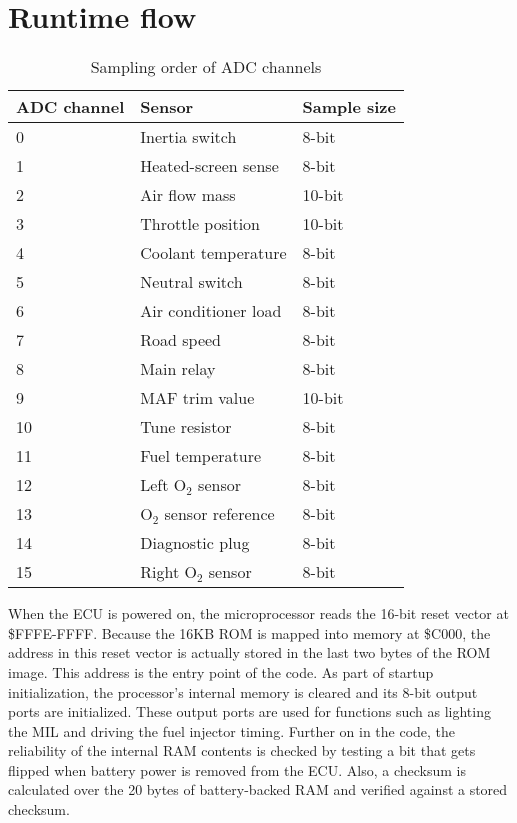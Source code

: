\documentclass[11pt,twocolumn]{scrartcl}
\begin{document}
\section {Runtime flow}
\begin{table*}
 \centering
 \begin{tabular}{|l|l|l|}
  \hline
  \bfseries{ADC channel} & \bfseries{Sensor} & \bfseries{Sample size} \\ \hline
  0  & Inertia switch & 8-bit \\ \hline
  1  & Heated-screen sense & 8-bit \\ \hline
  2  & Air flow mass & 10-bit \\ \hline
  3  & Throttle position & 10-bit \\ \hline
  4  & Coolant temperature & 8-bit \\ \hline
  5  & Neutral switch & 8-bit \\ \hline
  6  & Air conditioner load & 8-bit \\ \hline
  7  & Road speed & 8-bit \\ \hline
  8  & Main relay & 8-bit \\ \hline
  9  & MAF trim value & 10-bit \\ \hline
  10 & Tune resistor & 8-bit \\ \hline
  11 & Fuel temperature & 8-bit \\ \hline
  12 & Left O$_{2}$ sensor & 8-bit \\ \hline
  13 & O$_{2}$ sensor reference & 8-bit \\ \hline
  14 & Diagnostic plug & 8-bit \\ \hline
  15 & Right O$_{2}$ sensor & 8-bit \\ \hline
  \end{tabular}
 \caption{Sampling order of ADC channels \label{tab:ADCsampling}}
\end{table*}
When the ECU is powered on, the microprocessor reads the 16-bit reset vector at \$FFFE-FFFF. Because the 16KB ROM is mapped into memory at \$C000, the address in this reset vector is actually stored in the last two bytes of the ROM image. This address is the entry point of the code. As part of startup initialization, the processor's internal memory is cleared and its 8-bit output ports are initialized. These output ports are used for functions such as lighting the MIL and driving the fuel injector timing. Further on in the code, the reliability of the internal RAM contents is checked by testing a bit that gets flipped when battery power is removed from the ECU. Also, a checksum is calculated over the 20 bytes of battery-backed RAM and verified against a stored checksum.
\end{document}
